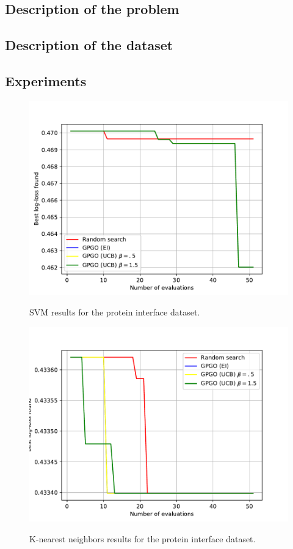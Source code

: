 \documentclass[10pt,a4paper,twoside]{book}
\begin{document}
\subsection{Description of the problem}
\subsection{Description of the dataset}
\subsection{Experiments}


\begin{figure}
\centering
\caption{SVM results for the protein interface dataset.}
\includegraphics[scale=0.75]{figures/chapter4/pinter/svm}
\label{fig:affsvm}
\end{figure}

\begin{figure}
\centering
\caption{K-nearest neighbors results for the protein interface dataset.}
\includegraphics[scale=0.75]{figures/chapter4/pinter/knn}
\label{fig:affknn}
\end{figure}
\end{document}
